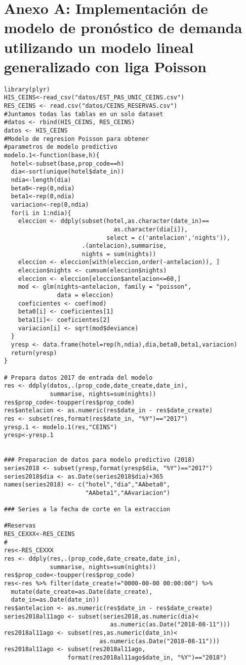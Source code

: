 \chapter{Anexo A: Implementación de modelo de pronóstico de demanda utilizando un modelo lineal generalizado con liga Poisson}
\label{ch:anexoa}

\begin{verbatim}
library(plyr)
HIS_CEINS<-read_csv("datos/EST_PAS_UNIC_CEINS.csv")
RES_CEINS <- read.csv("datos/CEINS_RESERVAS.csv")
#Juntamos todas las tablas en un solo dataset
#datos <- rbind(HIS_CEINS, RES_CEINS)
datos <- HIS_CEINS
#Modelo de regresion Poisson para obtener
#parametros de modelo predictivo
modelo.1<-function(base,h){
  hotel<-subset(base,prop_code==h)
  dia<-sort(unique(hotel$date_in))
  ndia<-length(dia)
  beta0<-rep(0,ndia)
  beta1<-rep(0,ndia)
  variacion<-rep(0,ndia)
  for(i in 1:ndia){
    eleccion <- ddply(subset(hotel,as.character(date_in)==
                               as.character(dia[i]),
                             select = c('antelacion','nights')),
                      .(antelacion),summarise, 
                      nights = sum(nights))
    eleccion <- eleccion[with(eleccion,order(-antelacion)), ]
    eleccion$nights <- cumsum(eleccion$nights)
    eleccion <- eleccion[eleccion$antelacion<=60,]
    mod <- glm(nights~antelacion, family = "poisson", 
               data = eleccion)
    coeficientes <- coef(mod)
    beta0[i] <- coeficientes[1]
    beta1[i]<- coeficientes[2]
    variacion[i] <- sqrt(mod$deviance)
  }
  yresp <- data.frame(hotel=rep(h,ndia),dia,beta0,beta1,variacion)
  return(yresp)
}

# Prepara datos 2017 de entrada del modelo
res <- ddply(datos,.(prop_code,date_create,date_in), 
             summarise, nights=sum(nights))
res$prop_code<-toupper(res$prop_code)
res$antelacion <- as.numeric(res$date_in - res$date_create)
res <- subset(res,format(res$date_in, "%Y")=="2017")
yresp.1 <- modelo.1(res,"CEINS")
yresp<-yresp.1


### Preparacion de datos para modelo predictivo (2018)
series2018 <- subset(yresp,format(yresp$dia, "%Y")=="2017")
series2018$dia <- as.Date(series2018$dia)+365
names(series2018) <- c("hotel","dia","AAbeta0",
                       "AAbeta1","AAvariacion")

### Series a la fecha de corte en la extraccion

#Reservas
RES_CEXXX<-RES_CEINS
#
res<-RES_CEXXX
res <- ddply(res,.(prop_code,date_create,date_in), 
             summarise, nights=sum(nights))
res$prop_code<-toupper(res$prop_code)
res<-res %>% filter(date_create!="0000-00-00 00:00:00") %>% 
  mutate(date_create=as.Date(date_create),
  date_in=as.Date(date_in))
res$antelacion <- as.numeric(res$date_in - res$date_create)
series2018al11ago <- subset(series2018,as.numeric(dia)<
                              as.numeric(as.Date("2018-08-11")))
res2018al11ago <- subset(res,as.numeric(date_in)<
                           as.numeric(as.Date("2018-08-11")))
res2018al11ago <- subset(res2018al11ago,
                  format(res2018al11ago$date_in, "%Y")=="2018")


\end{verbatim}
